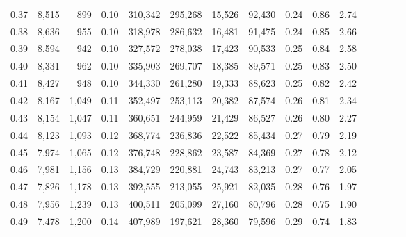 \begin{tabular}{rrrcrrrrrrrrrrr}
0.37 &  8,515 &    899 &                                       0.10 &  310,342 &  295,268 &   15,526 &   92,430 &  0.24 &  0.86 &                         2.74 \\
0.38 &  8,636 &    955 &                                       0.10 &  318,978 &  286,632 &   16,481 &   91,475 &  0.24 &  0.85 &                         2.66 \\
0.39 &  8,594 &    942 &                                       0.10 &  327,572 &  278,038 &   17,423 &   90,533 &  0.25 &  0.84 &                         2.58 \\
0.40 &  8,331 &    962 &                                       0.10 &  335,903 &  269,707 &   18,385 &   89,571 &  0.25 &  0.83 &                         2.50 \\
0.41 &  8,427 &    948 &                                       0.10 &  344,330 &  261,280 &   19,333 &   88,623 &  0.25 &  0.82 &                         2.42 \\
0.42 &  8,167 &  1,049 &                                       0.11 &  352,497 &  253,113 &   20,382 &   87,574 &  0.26 &  0.81 &                         2.34 \\
0.43 &  8,154 &  1,047 &                                       0.11 &  360,651 &  244,959 &   21,429 &   86,527 &  0.26 &  0.80 &                         2.27 \\
0.44 &  8,123 &  1,093 &                                       0.12 &  368,774 &  236,836 &   22,522 &   85,434 &  0.27 &  0.79 &                         2.19 \\
0.45 &  7,974 &  1,065 &                                       0.12 &  376,748 &  228,862 &   23,587 &   84,369 &  0.27 &  0.78 &                         2.12 \\
0.46 &  7,981 &  1,156 &                                       0.13 &  384,729 &  220,881 &   24,743 &   83,213 &  0.27 &  0.77 &                         2.05 \\
0.47 &  7,826 &  1,178 &                                       0.13 &  392,555 &  213,055 &   25,921 &   82,035 &  0.28 &  0.76 &                         1.97 \\
0.48 &  7,956 &  1,239 &                                       0.13 &  400,511 &  205,099 &   27,160 &   80,796 &  0.28 &  0.75 &                         1.90 \\
0.49 &  7,478 &  1,200 &                                       0.14 &  407,989 &  197,621 &   28,360 &   79,596 &  0.29 &  0.74 &                         1.83 \\

\end{tabular}
